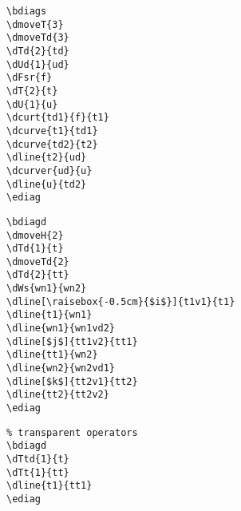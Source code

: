 \documentclass[a4paper]{article}
\begin{document}
 \begin{minipage}[b]{0.55\linewidth}\centering
  \begin{lstlisting}
\bdiags
\dmoveT{3}
\dmoveTd{3}
\dTd{2}{td}
\dUd{1}{ud}
\dFsr{f}
\dT{2}{t}
\dU{1}{u}
\dcurt{td1}{f}{t1}
\dcurve{t1}{td1}
\dcurve{td2}{t2}
\dline{t2}{ud}
\dcurver{ud}{u}
\dline{u}{td2}
\ediag
  \end{lstlisting}
 \end{minipage}
 \begin{minipage}[b]{0.45\linewidth}\centering
\bdiags
{}
\ediag
 \end{minipage}

 \begin{minipage}[b]{0.55\linewidth}\centering
  \begin{lstlisting}
\bdiagd
\dmoveH{2}
\dTd{1}{t}
\dmoveTd{2}
\dTd{2}{tt}
\dWs{wn1}{wn2}
\dline[\raisebox{-0.5cm}{$i$}]{t1v1}{t1}
\dline{t1}{wn1}
\dline{wn1}{wn1vd2}
\dline[$j$]{tt1v2}{tt1}
\dline{tt1}{wn2}
\dline{wn2}{wn2vd1}
\dline[$k$]{tt2v1}{tt2}
\dline{tt2}{tt2v2}
\ediag
\end{lstlisting}
\end{minipage}
 \begin{minipage}[b]{0.45\linewidth}\centering
\bdiagd
{}
\ediag
\end{minipage}

\begin{minipage}[b]{0.55\linewidth}\centering
 \begin{lstlisting}
% transparent operators
\bdiagd
\dTtd{1}{t}
\dTt{1}{tt}
\dline{t1}{tt1}
\ediag
\end{lstlisting}
\end{minipage}
 \begin{minipage}[b]{0.45\linewidth}\centering
\bdiagd
{}
\ediag
\end{minipage}
\end{document}
